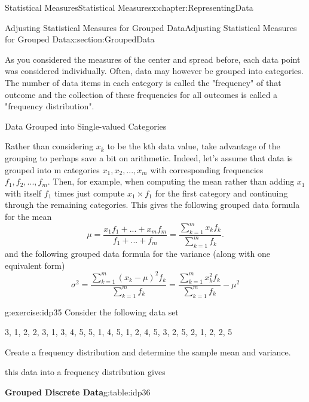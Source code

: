 \documentclass[oneside,10pt,]{book}
\numberwithin{equation}{section}
\begin{document}
\begin{chapterptx}{Statistical Measures}{}{Statistical Measures}{}{}{x:chapter:RepresentingData}
\typeout{************************************************}
%
\begin{sectionptx}{Adjusting Statistical Measures for Grouped Data}{}{Adjusting Statistical Measures for Grouped Data}{}{}{x:section:GroupedData}
\begin{introduction}{}%
As you considered the measures of the center and spread before, each data point was considered individually. Often, data may however be grouped into categories. The number of data items in each category is called the "frequency" of that outcome and the collection of these frequencies for all outcomes is called a "frequency distribution".%
\end{introduction}%
Data Grouped into Single-valued Categories%
\par
\hypertarget{x:p:GroupedDataDiscrete}{}%
Rather than considering \(x_k\) to be the kth data value, take advantage of the grouping to perhaps save a bit on arithmetic. Indeed, let's assume that data is grouped into m categories \(x_1, x_2, ..., x_m\) with corresponding frequencies \(f_1, f_2, ..., f_m\). Then, for example, when computing the mean rather than adding \(x_1\) with itself \(f_1\) times just compute \(x_1 \times f_1\) for the first category and continuing through the remaining categories. This gives the following grouped data formula for the mean%
\begin{equation*}
\mu = \frac{x_1 f_1 + ... + x_m f_m}{f_1 + ... + f_m} = \frac{\sum_{k=1}^m x_k f_k}{\sum_{k=1}^m f_k}.
\end{equation*}
and the following grouped data formula for the variance (along with one equivalent form)%
\begin{equation*}
\sigma^2 = \frac{\sum_{k=1}^m ( x_k-\mu )^2 f_k}{\sum_{k=1}^m f_k} = \frac{\sum_{k=1}^m x_k^2 f_k}{\sum_{k=1}^m f_k} - \mu^2
\end{equation*}
%
\begin{inlineexercise}{}{g:exercise:idp35}%
Consider the following data set%
\par
\textbraceleft{}3, 1, 2, 2, 3, 1, 3, 4, 5, 5, 1, 4, 5, 1, 2, 4, 5, 3, 2, 5, 2, 1, 2, 2, 5\textbraceright{}%
\par
Create a frequency distribution and determine the sample mean and variance.%
\par
\par\smallskip%
\noindentCollecting this data into a frequency distribution gives \begin{tableptx}{\textbf{Grouped Discrete Data}}{g:table:idp36}{}%

\end{tableptx}
\end{inlineexercise}
\end{sectionptx}
\end{chapterptx}
\end{document}
